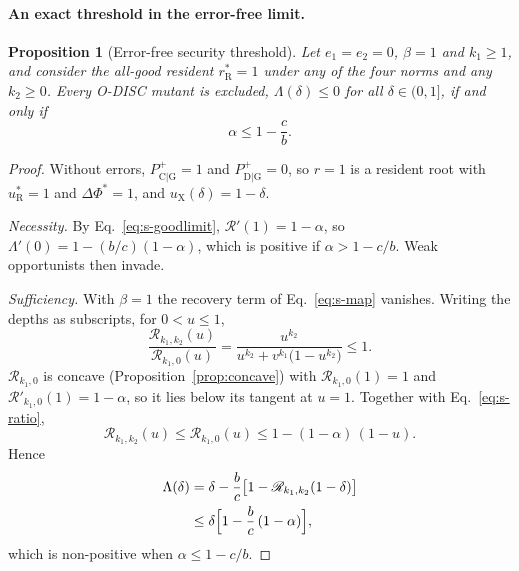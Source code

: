 \documentclass[10pt]{wlscirep}
\newcommand{\Rmap}{\mathscr{R}}            %
\newcommand{\Pp}[1]{P^{+}_{\mathrm{#1}}}   %
\newcommand{\rR}{r_{\mathrm{R}}^{*}}
\newcommand{\uR}{u_{\mathrm{R}}^{*}}
\newcommand{\uX}{u_{\mathrm{X}}}
\newcommand{\dPhi}{\Delta\Phi^{*}}
\theoremstyle{plain}
\newtheorem{proposition}[lemma]{Proposition}
\theoremstyle{remark}
\begin{document}
\paragraph{An exact threshold in the error-free limit.}
\begin{proposition}[Error-free security threshold]\label{prop:errorfree}
Let $e_1=e_2=0$, $\beta=1$ and $k_1\geq1$, and consider the all-good resident $\rR=1$ under any of the four norms and any $k_2\geq0$. Every O-DISC mutant is excluded, $\Lambda(\delta)\leq0$ for all $\delta\in(0,1]$, if and only if
\begin{equation}
\alpha\leq1-\frac{c}{b}.
\label{eq:s-errorfree}
\end{equation}
\end{proposition}
\begin{proof}
Without errors, $\Pp{C|G}=1$ and $\Pp{D|G}=0$, so $r=1$ is a resident root with $\uR=1$ and $\dPhi=1$, and $\uX(\delta)=1-\delta$.

\textit{Necessity.} By Eq.~\eqref{eq:s-goodlimit}, $\Rmap'(1)=1-\alpha$, so $\Lambda'(0)=1-(b/c)(1-\alpha)$, which is positive if $\alpha>1-c/b$. Weak opportunists then invade.

\textit{Sufficiency.} With $\beta=1$ the recovery term of Eq.~\eqref{eq:s-map} vanishes. Writing the depths as subscripts, for $0<u\leq1$,
\begin{equation}
\frac{\Rmap_{k_1,k_2}(u)}{\Rmap_{k_1,0}(u)}=\frac{u^{k_2}}{u^{k_2}+v^{k_1}\bigl(1-u^{k_2}\bigr)}\leq1.
\label{eq:s-ratio}
\end{equation}
$\Rmap_{k_1,0}$ is concave (Proposition~\ref{prop:concave}) with $\Rmap_{k_1,0}(1)=1$ and $\Rmap'_{k_1,0}(1)=1-\alpha$, so it lies below its tangent at $u=1$. Together with Eq.~\eqref{eq:s-ratio},
\begin{equation}
\Rmap_{k_1,k_2}(u)\leq\Rmap_{k_1,0}(u)\leq1-(1-\alpha)\,(1-u).
\label{eq:s-tangent}
\end{equation}
Hence
\begin{equation}
\begin{aligned}
\Lambda(\delta)&=\delta-\frac{b}{c}\bigl[1-\Rmap_{k_1,k_2}(1-\delta)\bigr]\\
&\leq\delta\Bigl[1-\frac{b}{c}\,(1-\alpha)\Bigr],
\end{aligned}
\label{eq:s-errorfree-bound}
\end{equation}
which is non-positive when $\alpha\leq1-c/b$.
\end{proof}
\end{document}
